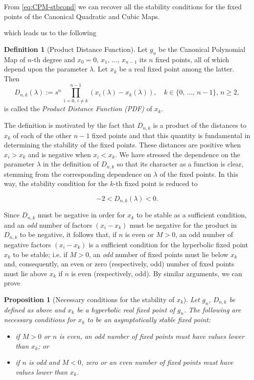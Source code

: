 \documentclass[10pt,twoside,titlepage]{book}
\numberwithin{equation}{chapter}
\numberwithin{figure}{chapter}
\numberwithin{table}{chapter}
\theoremstyle{plain}%
\newtheorem{prop}[thm]{Proposition}
\theoremstyle{definition}
\newtheorem{defn}{Definition}[chapter]
\theoremstyle{remark}
\begin{document}
From \eqref{eq:CPM-stbcond} we can recover all the stability conditions for the fixed points of the Canonical Quadratic and Cubic Maps.

which leads us to the following

\begin{defn}[Product Distance Function]
	Let $g_n$ be the Canonical Polynomial Map of $n$-th degree and $x_0=0,\,x_1,\,...,\,x_{n-1}$ its $n$ fixed points, all of which depend upon the parameter $\lambda$. Let $x_k$ be a real fixed point among the latter. Then
	\begin{equation}
		D_{n,k}(\lambda):=s^n\,\prod_{i=0,\,i\neq k}^{n-1}(x_i(\lambda)-x_k(\lambda)),\quad k\in\{0,\,...,\,n-1\},\,n\geq2,
	\end{equation}
	is called the \emph{Product Distance Function (PDF)} of $x_k$.
\end{defn}

The definition is motivated by the fact that $D_{n,k}$ is a product of the distances to $x_k$ of each of the other $n-1$ fixed points and that this quantity is fundamental in determining the stability of the fixed points. These distances are positive when $x_i>x_k$ and is negative when $x_i<x_k$. We have stressed the dependence on the parameter $\lambda$ in the definition of $D_{n,k}$ so that its character as a function is clear, stemming from the corresponding dependence on $\lambda$ of the fixed points. In this way, the stability condition for the $k$-th fixed point is reduced to

\begin{equation}
	-2<D_{n,k}(\lambda)<0.
\end{equation}

Since $D_{n,k}$ must be negative in order for $x_k$ to be stable as a sufficient condition, and an \emph{odd} number of factors $(x_i-x_k)$ must be negative for the product in $D_{n,k}$ to be negative, it follows that, if $n$ is even or $M>0$, an odd number of negative factors $(x_i-x_k)$ is a sufficient condition for the hyperbolic fixed point $x_k$ to be stable; i.e. if $M>0$, an \emph{odd} number of fixed points must lie below $x_k$ and, consequently, an even or zero (respectively, odd) number of fixed points must lie above $x_k$ if $n$ is even (respectively, odd). By similar arguments, we can prove

\begin{prop}[Necessary conditions for the stability of $x_k$]
	\label{prop:GPM-NecessaryConditions}
	Let $g_n$, $D_{n,k}$ be defined as above and $x_k$ be a hyperbolic real fixed point of $g_n$. The following are necessary conditions for $x_k$ to be an asymptotically stable fixed point:
	\begin{itemize}
		\item if $M>0$ or $n$ is even, an odd number of fixed points must have values lower than $x_k$; or
		\item if $n$ is odd and $M<0$, zero or an even number of fixed points must have values lower than $x_k$.
	\end{itemize}
\end{prop}
\end{document}
